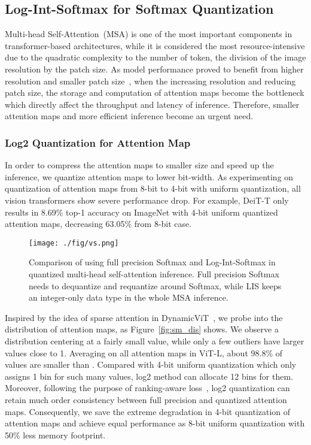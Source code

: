 \documentclass{article}
\begin{document}
\subsection{Log-Int-Softmax for Softmax Quantization}
\label{sec:lis}

Multi-head Self-Attention~(MSA) is one of the most important components in transformer-based architectures, while it is considered the most resource-intensive due to the quadratic complexity to the number of token, the division of the image resolution by the patch size. As model performance proved to benefit from higher resolution and smaller patch size~\cite{dosovitskiy2021an}, when the increasing resolution and reducing patch size, the storage and computation of attention maps become the bottleneck which directly affect the throughput and latency of inference. Therefore, smaller attention maps and more efficient inference become an urgent need.


\subsubsection{Log2 Quantization for Attention Map}

In order to compress the attention maps to smaller size and speed up the inference, we quantize attention maps to lower bit-width. As experimenting on quantization of attention maps from 8-bit to 4-bit with uniform quantization, all vision transformers show severe performance drop. For example, DeiT-T only results in 8.69\% top-1 accuracy on ImageNet with 4-bit uniform quantized attention maps, decreasing 63.05\% from 8-bit case.



\begin{figure}[t]
\centering
\texttt{[image: ./fig/vs.png]}
\vskip 0.03in
\caption{Comparison of using full precision Softmax and Log-Int-Softmax in quantized multi-head self-attention inference. Full precision Softmax needs to dequantize and requantize around Softmax, while LIS keeps an integer-only data type in the whole MSA inference.}
\label{fig:com_sm}
\end{figure}




Inspired by the idea of sparse attention in DynamicViT~\cite{rao2021dynamicvit}, we probe into the distribution of attention maps, as Figure~\ref{fig:sm_dis} shows. We observe a distribution centering at a fairly small value, while only a few outliers have larger values close to 1. Averaging on all attention maps in ViT-L, about 98.8\% of values are smaller than . Compared with 4-bit uniform quantization which only assigns 1 bin for such many values, log2 method can allocate 12 bins for them. Moreover, following the purpose of ranking-aware loss~\cite{liu2021post}, log2 quantization can retain much order consistency between full precision and quantized attention maps. Consequently, we save the extreme degradation in 4-bit quantization of attention maps and achieve equal performance as 8-bit uniform quantization with 50\% less memory footprint.
\end{document}
